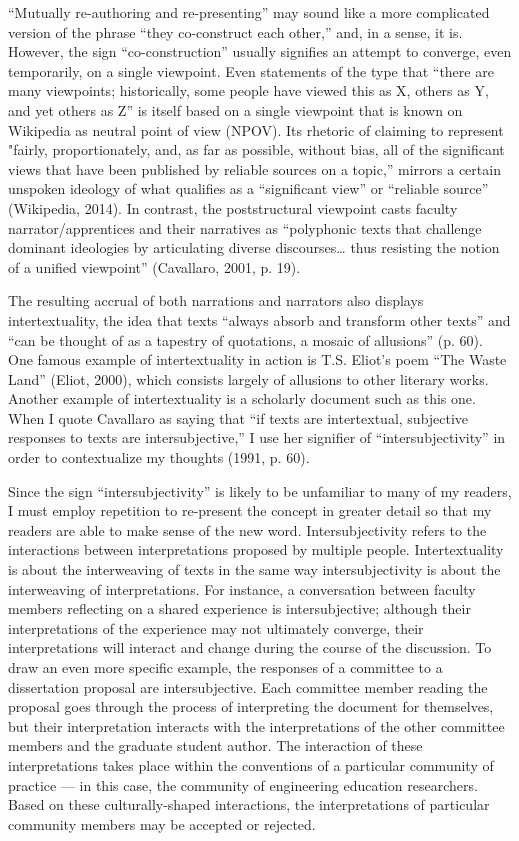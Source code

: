 “Mutually re-authoring and re-presenting” may sound like a more complicated version of the phrase “they co-construct each other,” and, in a sense, it is. However, the sign “co-construction” usually signifies an attempt to converge, even temporarily, on a single viewpoint. Even statements of the type that “there are many viewpoints; historically, some people have viewed this as X, others as Y, and yet others as Z” is itself based on a single viewpoint that is known on Wikipedia as neutral point of view (NPOV). Its rhetoric of claiming to represent "fairly, proportionately, and, as far as possible, without bias, all of the significant views that have been published by reliable sources on a topic,” mirrors a certain unspoken ideology of what qualifies as a “significant view” or “reliable source” (Wikipedia, 2014). In contrast, the poststructural viewpoint casts faculty narrator/apprentices and their narratives as “polyphonic texts that challenge dominant ideologies by articulating diverse discourses… thus resisting the notion of a unified viewpoint” (Cavallaro, 2001, p. 19).

The resulting accrual of both narrations and narrators also displays intertextuality, the idea that texts “always absorb and transform other texts” and “can be thought of as a tapestry of quotations, a mosaic of allusions” (p. 60). One famous example of intertextuality in action is T.S. Eliot’s poem “The Waste Land” (Eliot, 2000), which consists largely of allusions to other literary works. Another example of intertextuality is a scholarly document such as this one. When I quote Cavallaro as saying that “if texts are intertextual, subjective responses to texts are intersubjective,” I use her signifier of “intersubjectivity” in order to contextualize my thoughts (1991, p. 60).

Since the sign “intersubjectivity” is likely to be unfamiliar to many of my readers, I must employ repetition to re-present the concept in greater detail so that my readers are able to make sense of the new word. Intersubjectivity refers to the interactions between interpretations proposed by multiple people. Intertextuality is about the interweaving of texts in the same way intersubjectivity is about the interweaving of interpretations. For instance, a conversation between faculty members reflecting on a shared experience is intersubjective; although their interpretations of the experience may not ultimately converge, their interpretations will interact and change during the course of the discussion. To draw an even more specific example, the responses of a committee to a dissertation proposal are intersubjective. Each committee member reading the proposal goes through the process of interpreting the document for themselves, but their interpretation interacts with the interpretations of the other committee members and the graduate student author. The interaction of these interpretations takes place within the conventions of a particular community of practice — in this case, the community of engineering education researchers. Based on these culturally-shaped interactions, the interpretations of particular community members may be accepted or rejected.

